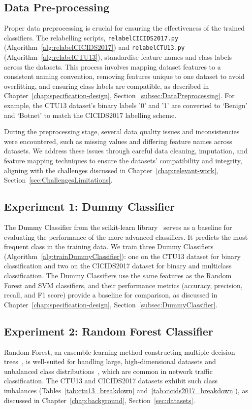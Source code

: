 \subsection{Data Pre-processing}\label{subsec:pre-processing}
Proper data preprocessing is crucial for ensuring the effectiveness of the trained classifiers. The relabelling scripts, \texttt{relabelCICIDS2017.py} (Algorithm~\ref{alg:relabelCICIDS2017}) and \texttt{relabelCTU13.py} (Algorithm~\ref{alg:relabelCTU13}), standardise feature names and class labels across the datasets. This process involves mapping dataset features to a consistent naming convention, removing features unique to one dataset to avoid overfitting, and ensuring class labels are compatible, as described in Chapter~\ref{chap:specification-design}, Section~\ref{subsec:DataPreprocessing}. For example, the CTU13 dataset's binary labels '0' and '1' are converted to `Benign' and `Botnet' to match the CICIDS2017 labelling scheme.

During the preprocessing stage, several data quality issues and inconsistencies were encountered, such as missing values and differing feature names across datasets. We address these issues through careful data cleaning, imputation, and feature mapping techniques to ensure the datasets' compatibility and integrity, aligning with the challenges discussed in Chapter~\ref{chap:relevant-work}, Section~\ref{sec:ChallengesLimitations}.

\subsection{Experiment 1: Dummy Classifier}\label{subsec:baseline-performance}
The Dummy Classifier from the scikit-learn library~\cite{pedregosa2011scikit} serves as a baseline for evaluating the performance of the more advanced classifiers. It predicts the most frequent class in the training data. We train three Dummy Classifiers (Algorithm~\ref{alg:trainDummyClassifier}): one on the CTU13 dataset for binary classification and two on the CICIDS2017 dataset for binary and multiclass classification. The Dummy Classifiers use the same features as the Random Forest and SVM classifiers, and their performance metrics (accuracy, precision, recall, and F1 score) provide a baseline for comparison, as discussed in Chapter~\ref{chap:specification-design}, Section~\ref{subsec:DummyClassifier}.

\subsection{Experiment 2: Random Forest Classifier}\label{subsec:random-forest-classifier}
Random Forest, an ensemble learning method constructing multiple decision trees~\cite{hastie2009random}, is well-suited for handling large, high-dimensional datasets and unbalanced class distributions~\cite{farnaaz2016random}, which are common in network traffic classification. The CTU13 and CICIDS2017 datasets exhibit such class imbalances (Tables~\ref{tab:ctu13_breakdown} and~\ref{tab:cicids2017_breakdown}), as discussed in Chapter~\ref{chap:background}, Section~\ref{sec:datasets}.

